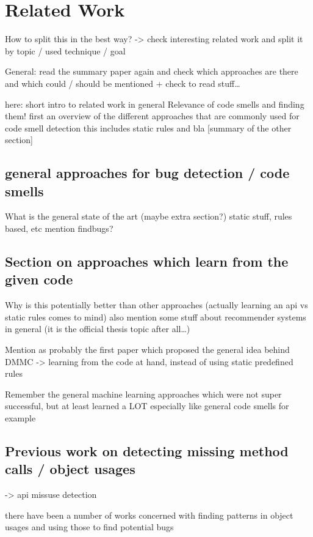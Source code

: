 \chapter{Related Work}

How to split this in the best way?
-> check interesting related work and split it by topic / used technique / goal

General: read the summary paper \cite{robillard2013automated} again and check which approaches are there and which could / should be mentioned
+ check to read stuff\ldots

here: short intro to related work in general
Relevance of code smells and finding them!
first an overview of the different approaches that are commonly used for code smell detection
this includes static rules and bla
[summary of the other section]

\section{general approaches for bug detection / code smells}
What is the general state of the art (maybe extra section?)
static stuff, rules based, etc
mention findbugs?

\section{Section on approaches which learn from the given code}
Why is this potentially better than other approaches (actually learning an api vs static rules comes to mind)
also mention some stuff about recommender systems in general (it is the official thesis topic after all\ldots)

Mention \cite{engler2001bugs} as probably the first paper which proposed the general idea behind DMMC -> learning from the code at hand, instead of using static predefined rules

Remember the general machine learning approaches which were not super successful, but at least learned a LOT
especially like general code smells for example

\section{Previous work on detecting missing method calls / object usages}
-> api missuse detection

there have been a number of works concerned with finding patterns in object usages and using those to find potential bugs


